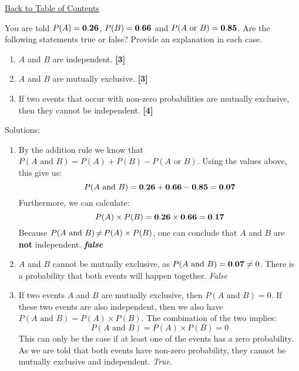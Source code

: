\documentclass[a4paper, leqno, 12pt]{report}
\newenvironment{top_enumerate}{
\begin{enumerate}
  \setlength{\itemsep}{2em}
  \setlength{\topsep}{-0pt}
  \setlength{\partopsep}{-0pt}
}{\end{enumerate}}
\begin{document}
\hyperlink{contents}{Back to Table of Contents}
\begin{top_enumerate}
\item You are told $P(A) = {\bf 0.26}$, $P(B) = {\bf 0.66}$ and $P(A \textrm{ or } B) = {\bf 0.85}$. Are the following statements true or false? Provide an explanation in each case.
 
\setcounter{equation}{0}  %
\begin{enumerate}
	\setlength{\topsep}{-0pt}
	\setlength{\partopsep}{-0pt}
	\setlength{\itemsep}{10pt}
			\item $A$ and $B$ are independent.
	 \quad \textbf{[3]}
		\item $A$ and $B$ are mutually exclusive.
	 \quad \textbf{[3]}
		\item If two events that occur with non-zero probabilities are mutually exclusive, then they cannot be independent.
	 \quad \textbf{[4]}
\end{enumerate}\addtocounter{enumi}{-1}
\item Solutions:
 
\setcounter{equation}{0}  %
\begin{enumerate}
	\setlength{\topsep}{-0pt}
	\setlength{\partopsep}{-0pt}
	\setlength{\itemsep}{10pt}
			\item By the addition rule we know that $P(A \textrm{ and } B) = P(A) + P(B) - P(A \textrm{ or } B)$. Using the values above, this give us:
	\[
	P(A \textrm{ and } B) = {\bf 0.26} + {\bf 0.66} - {\bf 0.85} = {\bf 0.07}
	\]
	Furthermore, we can calculate:
	\[
	P(A)\times P(B) = {\bf 0.26} \times {\bf 0.66} = {\bf 0.17}
	\]
	Because $P(A \textrm{ and } B) \, {\bf  \ne} \, P(A)\times P(B)$, one can conclude that $A$ and $B$ are {\bf  not }independent. \emph{{\bf false}}
	 \quad \textbf{}
		\item $A$ and $B$ cannot be mutually exclusive, as $P(A \textrm{ and } B) = {\bf 0.07} \ne 0$. There is a probability that both events will happen together. \emph{False}
	 \quad \textbf{}
		\item If two events $A$ and $B$ are mutually exclusive, then $P(A \textrm{ and } B) = 0$. If these two events are also independent, then  we also have $P(A \textrm{ and } B) = P(A)\times P(B)$. The combination of the two implies:
	\[
	P(A \textrm{ and } B) = P(A)\times P(B) = 0
	\]
	This can only be the case if at least one of the events has a zero probability. As we are told that both events have non-zero probability, they cannot be mutually exclusive and independent. \emph{True}.
	 \quad \textbf{}
\end{enumerate}\newpage
\end{top_enumerate}
\end{document}
